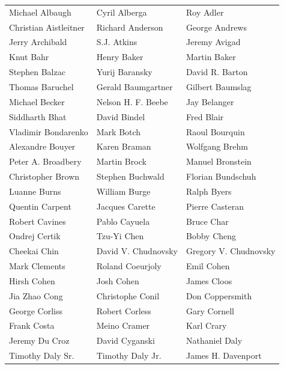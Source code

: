 \begin{tabular}{lll}
Michael Albaugh        & Cyril Alberga          & Roy Adler\\
Christian Aistleitner  & Richard Anderson       & George Andrews\\
Jerry Archibald        & S.J. Atkins            & Jeremy Avigad\\
Knut Bahr              & Henry Baker            & Martin Baker\\
Stephen Balzac         & Yurij Baransky         & David R. Barton\\
Thomas Baruchel        & Gerald Baumgartner     & Gilbert Baumslag\\
Michael Becker         & Nelson H. F. Beebe     & Jay Belanger\\
Siddharth Bhat         & David Bindel           & Fred Blair\\
Vladimir Bondarenko    & Mark Botch             & Raoul Bourquin\\
Alexandre Bouyer       & Karen Braman           & Wolfgang Brehm\\
Peter A. Broadbery     & Martin Brock           & Manuel Bronstein\\
Christopher Brown      & Stephen Buchwald       & Florian Bundschuh\\
Luanne Burns           & William Burge          & Ralph Byers\\
Quentin Carpent        & Jacques Carette        & Pierre Casteran\\
Robert Cavines         & Pablo Cayuela          & Bruce Char\\
Ondrej Certik          & Tzu-Yi Chen            & Bobby Cheng\\
Cheekai Chin           & David V. Chudnovsky    & Gregory V. Chudnovsky\\
Mark Clements          & Roland Coeurjoly       & Emil Cohen\\
Hirsh Cohen            & Josh Cohen             & James Cloos\\
Jia Zhao Cong          & Christophe Conil       & Don Coppersmith\\
George Corliss         & Robert Corless         & Gary Cornell\\
Frank Costa            & Meino Cramer           & Karl Crary\\
Jeremy Du Croz         & David Cyganski         & Nathaniel Daly\\
Timothy Daly Sr.       & Timothy Daly Jr.       & James H. Davenport\\

\end{tabular}
